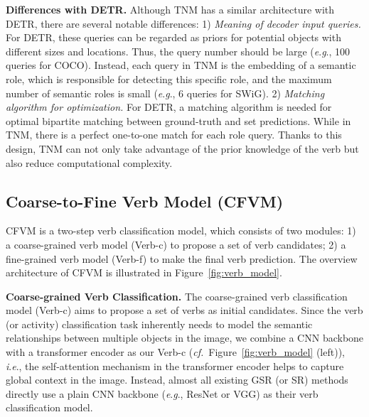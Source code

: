 \documentclass[letterpaper]{article} %
\newcommand{\ie}{\textit{i}.\textit{e}.}
\newcommand{\eg}{\textit{e}.\textit{g}.}
\newcommand{\cf}{\textit{cf.}}
\begin{document}
\noindent\textbf{Differences with DETR.} Although TNM has a similar architecture with DETR, there are several notable differences: 1) \emph{Meaning of decoder input queries.} For DETR, these queries can be regarded as priors for potential objects with different sizes and locations. Thus, the query number should be large (\eg, 100 queries for COCO). Instead, each query in TNM is the embedding of a semantic role, which is responsible for detecting this specific role, and the maximum number of semantic roles is small (\eg, 6 queries for SWiG). 2) \emph{Matching algorithm for optimization.} For DETR, a matching algorithm is needed for optimal bipartite matching between ground-truth and set predictions. While in TNM, there is a perfect one-to-one match for each role query. Thanks to this design, TNM can not only take advantage of the prior knowledge of the verb but also reduce computational complexity.






\subsection{Coarse-to-Fine Verb Model (CFVM)}

CFVM is a two-step verb classification model, which consists of two modules: 1) a coarse-grained verb model (Verb-c) to propose a set of verb candidates; 2) a fine-grained verb model (Verb-f) to make the final verb prediction. The overview architecture of CFVM is illustrated in Figure~\ref{fig:verb_model}.


\noindent\textbf{Coarse-grained Verb Classification.}
The coarse-grained verb classification model (Verb-c) aims to propose a set of verbs as initial candidates. Since the verb (or activity) classification task inherently needs to model the semantic relationships between multiple objects in the image, we combine a CNN backbone with a transformer encoder as our Verb-c (\cf~Figure~\ref{fig:verb_model} (left)), \ie, the self-attention mechanism in the transformer encoder helps to capture global context in the image. Instead, almost all existing GSR (or SR) methods directly use a plain CNN backbone (\eg, ResNet or VGG) as their verb classification model.
\end{document}
